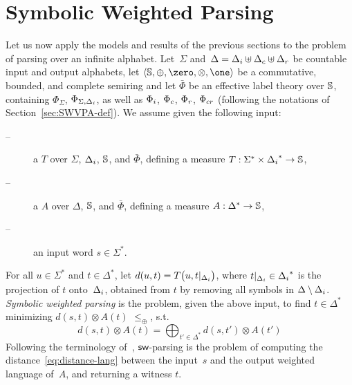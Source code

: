 \section{Symbolic Weighted Parsing}
\label{sec:parsing}

Let us now apply the models and results of the previous sections %
to the problem of parsing over an infinite alphabet. %
%
%
Let~$\Sigma$
and~$\Delta = \Deltai \uplus \Deltac \uplus \Deltar$
be countable input and output alphabets,
let $\< \Semiring, \oplus, \zero, \otimes, \one>$ be a
commutative, bounded, and complete  semiring
and let $\bar\Phi$ be an effective label theory over $\mathbb{S}$,
containing $\Phi_\Sigma$, $\Phi_{\Sigma, \Deltai}$, as well as
$\Phii$, $\Phic$, $\Phir$, $\Phicr$
(following the notations of Section~\ref{sec:SWVPA-def}).
%
\noindent
We assume given the following input:
\begin{description}
\item[--] a \SWT $T$ over $\Sigma$, $\Deltai$, $\mathbb{S}$, and $\bar\Phi$,
defining a measure %
$T: \Sigma^* \times \Deltai^* \to \Semiring$,

\item[--] a \SWVPA $A$ over $\Delta$, $\mathbb{S}$, and $\bar\Phi$,
defining a measure $A: \Delta^* \to \mathbb{S}$,
\item[--] an input word $s \in \Sigma^*$.
\end{description}
%
For all $u \in \Sigma^*$ and $t \in \Delta^*$, let
\(d(u, t) = T\bigl(u, t|_\Deltai \bigr)\),
where $t|_\Deltai \in \Deltai^*$ is the projection of $t$ onto~$\Deltai$,
obtained from $t$ by removing all symbols in $\Delta \setminus \Deltai$.
%
\noindent
\emph{Symbolic weighted parsing} is the problem,
given the above input,
to find $t \in \Delta^*$ %
minimizing \( d(s, t) \otimes A(t)\)
\wrt $\leq_\oplus$,
\ie s.t. %
%
\begin{equation}\label{eq:distance-lang}
d(s, t) \otimes A(t) = \displaystyle\bigoplus_{t' \in \Delta^*} d(s, t') \otimes A(t')
\end{equation}
%
Following the terminology of~\cite{Mohri03EDWA},
$\textsf{sw}$-parsing is the problem of computing
the distance~\eqref{eq:distance-lang} between the input~$s$ and the output weighted language of~$A$,
and returning a witness $t$.

